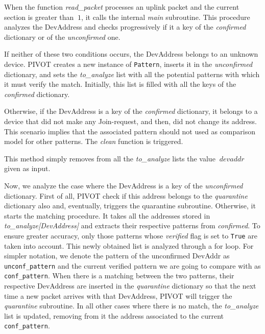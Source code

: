 \vspace{3mm}

\vspace{3mm}

When the function \textit{read\_packet} processes an uplink packet and the current section is greater than \(\ 1 \), it calls the internal \textit{main} subroutine. This procedure analyzes the DevAddress and checks progressively if it a key of the \textit{confirmed} dictionary or of the \textit{unconfirmed} one.
\vspace{3mm}

\vspace{3mm}

If neither of these two conditions occurs, the DevAddress belongs to an unknown device. PIVOT creates a new instance of \texttt{Pattern}, inserts it in the \textit{unconfirmed} dictionary, and sets the \textit{to\_analyze} list with all the potential patterns with which it must verify the match. Initially, this list is filled with all the keys of the \textit{confirmed} dictionary.

\vspace{3mm}

Otherwise, if the DevAddress is a key of the \textit{confirmed} dictionary, it belongs to a device that did not make any Join-request, and then, did not change its address. This scenario implies that the associated pattern should not used as comparison model for other patterns. The \textit{clean} function is triggered. 

\vspace{3mm}

\vspace{3mm}

This method simply removes from all the \textit{to\_analyze} lists the value \(\ devaddr \) given as input.

\vspace{3mm}

\vspace{3mm}

Now, we analyze the case where the DevAddress is a key of the \textit{unconfirmed} dictionary. First of all, PIVOT check if this address belongs to the \textit{quarantine} dictionary also and, eventually, triggers the quarantine subroutine. Otherwise, it starts the matching procedure. It takes all the addresses stored in \textit{to\_analyze[DevAddress]} and extracts their respective patterns from \textit{confirmed}. To ensure greater accuracy, only those patterns whose \textit{verified} flag is set to \texttt{True} are taken into account. This newly obtained list is analyzed through a for loop. For simpler notation, we denote the pattern of the unconfirmed DevAddr as \texttt{unconf\_pattern} and the current verified pattern we are going to compare with as \texttt{conf\_pattern}. When there is a matching between the two patterns, their respective DevAddress are inserted in the \textit{quarantine} dictionary so that the next time a new packet arrives with that DevAddress, PIVOT will trigger the \textit{quarantine} subroutine. In all other cases where there is no match, the \textit{to\_analyze} list is updated, removing from it the address associated to the current \texttt{conf\_pattern}.

